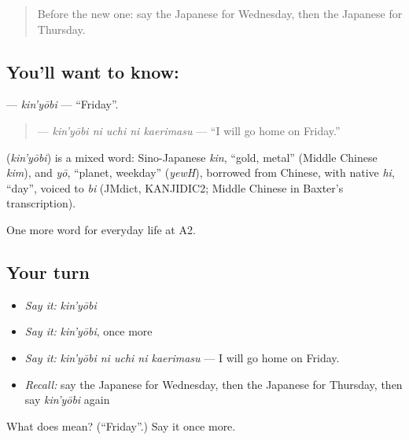 \begin{quote}
Before the new one: say the Japanese for Wednesday, then the Japanese for Thursday.
\end{quote}

\subsection*{You'll want to know: }
\textbf{} — \emph{kin'yōbi} — \textquotedblleft{}Friday\textquotedblright{}.

\begin{quote}
\textbf{  } — \emph{kin'yōbi ni uchi ni kaerimasu} — \textquotedblleft{}I will go home on Friday.\textquotedblright{}
\end{quote}

\begin{cousinweb}
\textbf{} (\emph{kin'yōbi}) is a mixed word: Sino-Japanese \emph{kin}, \textquotedblleft{}gold, metal\textquotedblright{} (Middle Chinese \emph{kim}), and \emph{yō}, \textquotedblleft{}planet, weekday\textquotedblright{} (\emph{yewH}), borrowed from Chinese, with native \emph{hi}, \textquotedblleft{}day\textquotedblright{}, voiced to \emph{bi} (JMdict, KANJIDIC2; Middle Chinese in Baxter's transcription).
\end{cousinweb}

\begin{grammarlens}[title={What you've built}]
One more word for everyday life at A2.
\end{grammarlens}

\subsection*{Your turn}
\begin{itemize}
\raggedright
  \item \emph{Say it:} \emph{kin'yōbi}
  \item \emph{Say it:} \emph{kin'yōbi}, once more
  \item \emph{Say it:} \emph{kin'yōbi ni uchi ni kaerimasu} — I will go home on Friday.
  \item \emph{Recall:} say the Japanese for Wednesday, then the Japanese for Thursday, then say \emph{kin'yōbi} again
\end{itemize}

\begin{tcolorbox}[breakable,colback=teal!4,colframe=teal!35!black,title={Before you move on}]
What does  mean? (\textquotedblleft{}Friday\textquotedblright{}.) Say it once more.
\end{tcolorbox}
